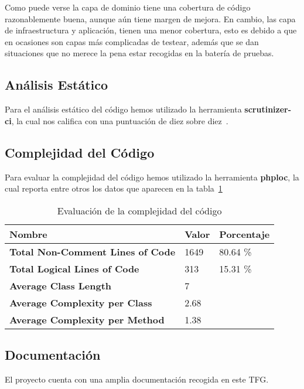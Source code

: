 Como puede verse la capa de dominio tiene una cobertura de código razonablemente buena, aunque aún tiene margen de
mejora.
En cambio, las capa de infraestructura y aplicación, tienen una menor cobertura, esto es debido a que en ocasiones son
capas más complicadas de testear, además que se dan situaciones que no merece la pena estar recogidas en la batería de
pruebas.

\subsection*{Análisis Estático}

Para el análisis estático del código hemos utilizado la herramienta \textbf{scrutinizer-ci}, la cual nos califica
con una puntuación de diez sobre diez~\cite{url_scrutinizer_viu_84_proyecto}.

\subsection*{Complejidad del Código}

Para evaluar la complejidad del código hemos utilizado la herramienta \textbf{phploc}, la cual reporta entre otros los
datos que aparecen en la tabla~\ref{tab:phploc_report}

\begin{table}[h]
    \renewcommand{\arraystretch}{1.5}
    \setlength{\tabcolsep}{10pt}
    \begin{tabular}{>{\bfseries}p{} p{} p{}}
        \toprule
        \textbf{Nombre}                 & \textbf{Valor} & \textbf{Porcentaje} \\
        \midrule
        Total Non-Comment Lines of Code & 1649           & 80.64 \%            \\
        Total Logical Lines of Code     & 313            & 15.31 \%            \\
        Average Class Length            & 7              &                     \\
        Average Complexity per Class    & 2.68           &                     \\
        Average Complexity per Method   & 1.38           &                     \\
        \bottomrule
    \end{tabular}
    \caption{Evaluación de la complejidad del código}
    \label{tab:phploc_report}
\end{table}

\subsection*{Documentación}

El proyecto cuenta con una amplia documentación recogida en este TFG.
